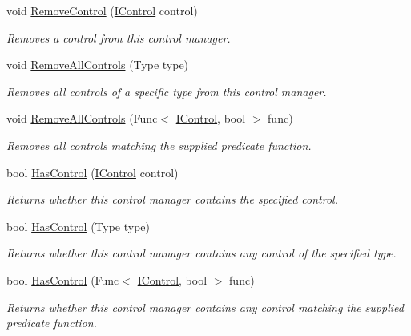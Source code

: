 \begin{DoxyCompactItemize}
void \hyperlink{class_tri_devs_1_1_tri_engine2_d_1_1_u_i_1_1_control_manager_adfba4b495200237df9fe1a639e4d3cd1}{Remove\-Control} (\hyperlink{interface_tri_devs_1_1_tri_engine2_d_1_1_u_i_1_1_i_control}{I\-Control} control)
\begin{DoxyCompactList}\small\item\em Removes a control from this control manager. \end{DoxyCompactList}\item 
void \hyperlink{class_tri_devs_1_1_tri_engine2_d_1_1_u_i_1_1_control_manager_a4ca8d60d1d760c15b4405a6c6ef31ff9}{Remove\-All\-Controls} (Type type)
\begin{DoxyCompactList}\small\item\em Removes all controls of a specific type from this control manager. \end{DoxyCompactList}\item 
void \hyperlink{class_tri_devs_1_1_tri_engine2_d_1_1_u_i_1_1_control_manager_a55d942e5871a9a0db0444fbf61b72173}{Remove\-All\-Controls} (Func$<$ \hyperlink{interface_tri_devs_1_1_tri_engine2_d_1_1_u_i_1_1_i_control}{I\-Control}, bool $>$ func)
\begin{DoxyCompactList}\small\item\em Removes all controls matching the supplied predicate function. \end{DoxyCompactList}\item 
bool \hyperlink{class_tri_devs_1_1_tri_engine2_d_1_1_u_i_1_1_control_manager_a72cb69369698795e217ca10a866514a4}{Has\-Control} (\hyperlink{interface_tri_devs_1_1_tri_engine2_d_1_1_u_i_1_1_i_control}{I\-Control} control)
\begin{DoxyCompactList}\small\item\em Returns whether this control manager contains the specified control. \end{DoxyCompactList}\item 
bool \hyperlink{class_tri_devs_1_1_tri_engine2_d_1_1_u_i_1_1_control_manager_a27946ddd8feaaf69b52a9bd10a68a12f}{Has\-Control} (Type type)
\begin{DoxyCompactList}\small\item\em Returns whether this control manager contains any control of the specified type. \end{DoxyCompactList}\item 
bool \hyperlink{class_tri_devs_1_1_tri_engine2_d_1_1_u_i_1_1_control_manager_a3e36debcaf401caaa5410a79acb9438a}{Has\-Control} (Func$<$ \hyperlink{interface_tri_devs_1_1_tri_engine2_d_1_1_u_i_1_1_i_control}{I\-Control}, bool $>$ func)
\begin{DoxyCompactList}\small\item\em Returns whether this control manager contains any control matching the supplied predicate function. \end{DoxyCompactList}\end{DoxyCompactItemize}
